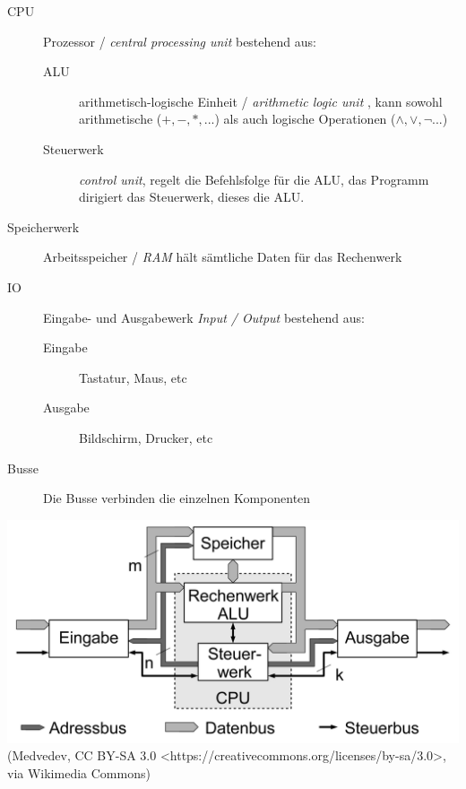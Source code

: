 \documentclass{article}
\begin{document}
\begin{description}
    \item[CPU]  Prozessor /  \emph{central processing unit} bestehend aus:
    \begin{description}
        \item[ALU]  arithmetisch-logische Einheit / \emph{ arithmetic logic unit} , kann sowohl arithmetische ($+,-,*,$...) als auch logische Operationen ($\land,\lor,\lnot$...)
        \item[Steuerwerk] \emph{control unit}, regelt die Befehlsfolge für die ALU, das Programm dirigiert das Steuerwerk, dieses die ALU. 
    \end{description}
    \item[Speicherwerk] Arbeitsspeicher / \emph{RAM} hält sämtliche Daten für das Rechenwerk 
    \item[IO]  Eingabe- und Ausgabewerk  \emph{Input / Output} bestehend aus:
    \begin{description}
        \item[Eingabe] Tastatur, Maus, etc 
        \item[Ausgabe]  Bildschirm, Drucker, etc
    \end{description}
    \item[Busse] Die Busse verbinden die einzelnen Komponenten
\end{description}

 
\includegraphics[width=\textwidth]{neumann.png} 
(Medvedev, CC BY-SA 3.0 <https://creativecommons.org/licenses/by-sa/3.0>, via Wikimedia Commons)


\end{document}
